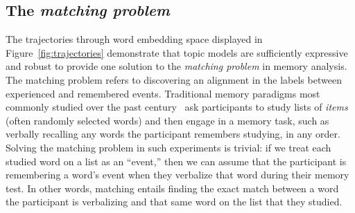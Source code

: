 \documentclass{article}
\begin{document}
\subsection*{The \textit{matching problem}}
The trajectories through word embedding space displayed in Figure~\ref{fig:trajectories} demonstrate that topic models are sufficiently expressive and robust to provide one solution to the \textit{matching problem} in memory analysis.  The matching problem refers to discovering an alignment in the labels between experienced and remembered events.  Traditional memory paradigms most commonly studied over the past century~\citep{Kaha12} ask participants to study lists of \textit{items} (often randomly selected words) and then engage in a memory task, such as verbally recalling any words the participant remembers studying, in any order.  Solving the matching problem in such experiments is trivial: if we treat each studied word on a list as an ``event,'' then we can assume that the participant is remembering a word's event when they verbalize that word during their memory test.  In other words, matching entails finding the exact match between a word the participant is verbalizing and that same word on the list that they studied.
\end{document}
